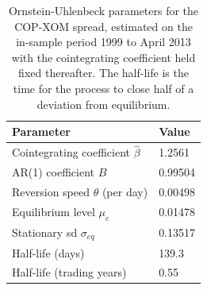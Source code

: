 \begin{table}[H]
\centering
\caption{Ornstein-Uhlenbeck parameters for the COP-XOM spread, estimated on the in-sample period 1999 to April 2013 with the cointegrating coefficient held fixed thereafter. The half-life is the time for the process to close half of a deviation from equilibrium.} 
\label{tab:ou_params}
\begin{tabular}{ll}
  \toprule
Parameter & Value \\ 
  \midrule
Cointegrating coefficient $\hat{\beta}$ & 1.2561 \\ 
  AR(1) coefficient $B$ & 0.99504 \\ 
  Reversion speed $\theta$ (per day) & 0.00498 \\ 
  Equilibrium level $\mu_e$ & 0.01478 \\ 
  Stationary sd $\sigma_{eq}$ & 0.13517 \\ 
  Half-life (days) & 139.3 \\ 
  Half-life (trading years) & 0.55 \\ 
   \bottomrule
\end{tabular}
\end{table}
